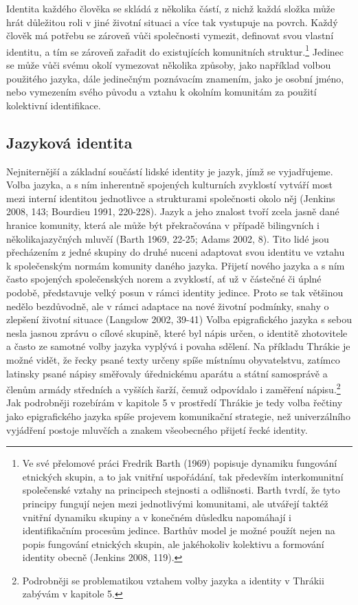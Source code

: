 Identita každého člověka se skládá z několika částí, z nichž každá složka může hrát důležitou roli v jiné životní situaci a více tak vystupuje na povrch. Každý člověk má potřebu se zároveň vůči společnosti vymezit, definovat svou vlastní identitu, a tím se zároveň zařadit do existujících komunitních struktur.\footnote{Ve své přelomové práci Fredrik Barth (1969) popisuje dynamiku fungování etnických skupin, a to jak vnitřní uspořádání, tak především interkomunitní společenské vztahy na principech stejnosti a odlišnosti. Barth tvrdí, že tyto principy fungují nejen mezi jednotlivými komunitami, ale utvářejí taktéž vnitřní dynamiku skupiny a v konečném důsledku napomáhají i identifikačním procesům jedince. Barthův model je možné použít nejen na popis fungování etnických skupin, ale jakéhokoliv kolektivu a formování identity obecně (Jenkins 2008, 119).} Jedinec se může vůči svému okolí vymezovat několika způsoby, jako například volbou použitého jazyka, dále jedinečným poznávacím znamením, jako je osobní jméno, nebo vymezením svého původu a vztahu k okolním komunitám za použití kolektivní identifikace.

\subsection[jazyková-identita]{Jazyková identita}

Nejniternější a základní součástí lidské identity je jazyk, jímž se vyjadřujeme. Volba jazyka, a s ním inherentně spojených kulturních zvyklostí vytváří most mezi interní identitou jednotlivce a strukturami společnosti okolo něj (Jenkins 2008, 143; Bourdieu 1991, 220-228). Jazyk a jeho znalost tvoří zcela jasně dané hranice komunity, která ale může být překračována v případě bilingvních i několikajazyčných mluvčí (Barth 1969, 22-25; Adams 2002, 8). Tito lidé jsou přecházením z jedné skupiny do druhé nuceni adaptovat svou identitu ve vztahu k společenským normám komunity daného jazyka. Přijetí nového jazyka a s ním často spojených společenských norem a zvyklostí, ať už v částečné či úplné podobě, představuje velký posun v rámci identity jedince. Proto se tak většinou nedělo bezdůvodně, ale v rámci adaptace na nové životní podmínky, snahy o zlepšení životní situace (Langslow 2002, 39-41) Volba epigrafického jazyka s sebou nesla jasnou zprávu o cílové skupině, které byl nápis určen, o identitě zhotovitele a často ze samotné volby jazyka vyplývá i povaha sdělení. Na příkladu Thrákie je možné vidět, že řecky psané texty určeny spíše místnímu obyvatelstvu, zatímco latinsky psané nápisy směřovaly úřednickému aparátu a státní samosprávě a členům armády středních a vyšších šarží, čemuž odpovídalo i zaměření nápisu.\footnote{Podrobněji se problematikou vztahem volby jazyka a identity v Thrákii zabývám v kapitole 5.} Jak podrobněji rozebírám v kapitole 5 v prostředí Thrákie je tedy volba řečtiny jako epigrafického jazyka spíše projevem komunikační strategie, než univerzálního vyjádření postoje mluvčích a znakem všeobecného přijetí řecké identity.

